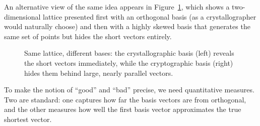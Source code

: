 An alternative view of the same idea appears in Figure~\ref{fig:ch06-lattice-bases}, which shows a two-dimensional lattice presented first with an orthogonal basis (as a crystallographer would naturally choose) and then with a highly skewed basis that generates the same set of points but hides the short vectors entirely.

\begin{figure}[t]
\centering
{}
\caption{Same lattice, different bases: the crystallographic basis (left) reveals the short vectors immediately, while the cryptographic basis (right) hides them behind large, nearly parallel vectors.}
\label{fig:ch06-lattice-bases}
\end{figure}

To make the notion of ``good'' and ``bad'' precise, we need quantitative measures.  Two are standard: one captures how far the basis vectors are from orthogonal, and the other measures how well the first basis vector approximates the true shortest vector.


